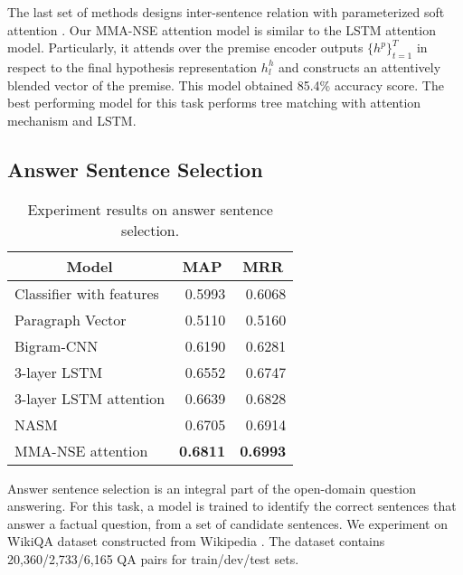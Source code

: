 \documentclass{article}
\begin{document}
The last set of methods designs inter-sentence relation with parameterized soft attention \cite{bahdanau:15}. Our MMA-NSE attention model is similar to the LSTM attention model. Particularly, it attends over the premise encoder outputs  $\lbrace h^p \rbrace ^T_{t=1}$ in respect to the final hypothesis representation $h^h_l$ and constructs an attentively blended vector of the premise. This model obtained 85.4\% accuracy score. The best performing model for this task performs tree matching with attention mechanism and LSTM.

\subsection{Answer Sentence Selection}

\begin{table}[b]
\begin{center}
\small
\begin{tabular}{c|c|c}
\hline 
Model & MAP & MRR \\
\hline
\multicolumn{1}{l|}{Classifier with features \cite{yih13}} & \multicolumn{1}{|r|}{0.5993} & \multicolumn{1}{|r}{0.6068} \\
\hline
\multicolumn{1}{l|}{Paragraph Vector \cite{le2014}} & \multicolumn{1}{|r|}{0.5110} & \multicolumn{1}{|r}{0.5160} \\
\multicolumn{1}{l|}{Bigram-CNN \cite{yu2014}} & \multicolumn{1}{|r|}{0.6190} & \multicolumn{1}{|r}{0.6281} \\
\multicolumn{1}{l|}{3-layer LSTM \cite{miao2016}} & \multicolumn{1}{|r|}{0.6552} & \multicolumn{1}{|r}{0.6747} \\
\multicolumn{1}{l|}{3-layer LSTM attention \cite{miao2016}} & \multicolumn{1}{|r|}{0.6639} & \multicolumn{1}{|r}{0.6828} \\
\multicolumn{1}{l|}{NASM \cite{miao2016}} & \multicolumn{1}{|r|}{0.6705} & \multicolumn{1}{|r}{0.6914} \\
\multicolumn{1}{l|}{MMA-NSE attention} & \multicolumn{1}{|r|}{\bf 0.6811} & \multicolumn{1}{|r}{\bf 0.6993} \\
\hline
\end{tabular}
\end{center}
\caption{\label{table:qa}Experiment results on answer sentence selection.}
\end{table}

Answer sentence selection is an integral part of the open-domain question answering. For this task, a model is trained to identify the correct sentences that answer a factual question, from a set of candidate sentences. We experiment on WikiQA dataset constructed from Wikipedia \cite{yang2015wikiqa}. The dataset contains 20,360/2,733/6,165 QA pairs for train/dev/test sets. 
\end{document}
